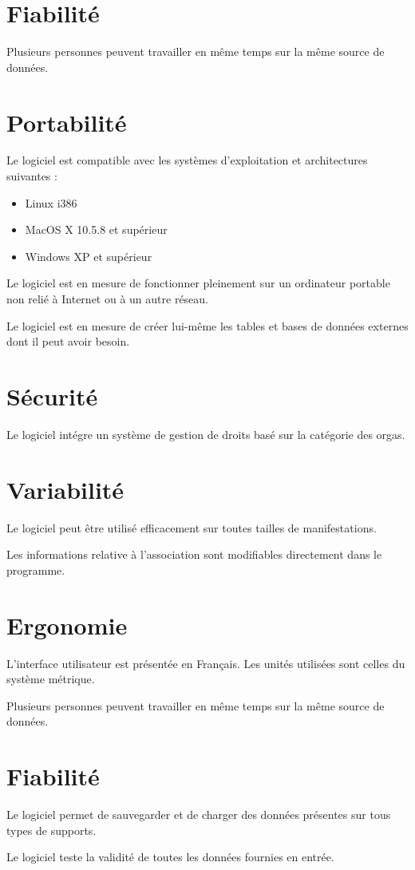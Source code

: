 \section{Fiabilité}
Plusieurs personnes peuvent travailler en même temps sur la même source de données.


\section{Portabilité}
Le logiciel est compatible avec les systèmes d'exploitation et architectures suivantes : 
\begin{itemize}
\item Linux i386
\item MacOS X 10.5.8 et supérieur
\item Windows XP et supérieur
\end{itemize}

Le logiciel est en mesure de fonctionner pleinement sur un ordinateur portable non relié à Internet ou à un autre réseau.

Le logiciel est en mesure de créer lui-même les tables et bases de données externes dont il peut avoir besoin.


\section{Sécurité}
Le logiciel intégre un système de gestion de droits basé sur la catégorie des orgas.


\section{Variabilité}
Le logiciel peut être utilisé efficacement sur toutes tailles de manifestations.

Les informations relative à l'association sont modifiables directement dans le programme.

\section{Ergonomie}
L'interface utilisateur est présentée en Français. Les unités utilisées sont celles du système métrique. 

Plusieurs personnes peuvent travailler en même temps sur la même source de données.


\section{Fiabilité}
Le logiciel permet de sauvegarder et de charger des données présentes sur tous types de supports.

Le logiciel teste la validité de toutes les données fournies en entrée.